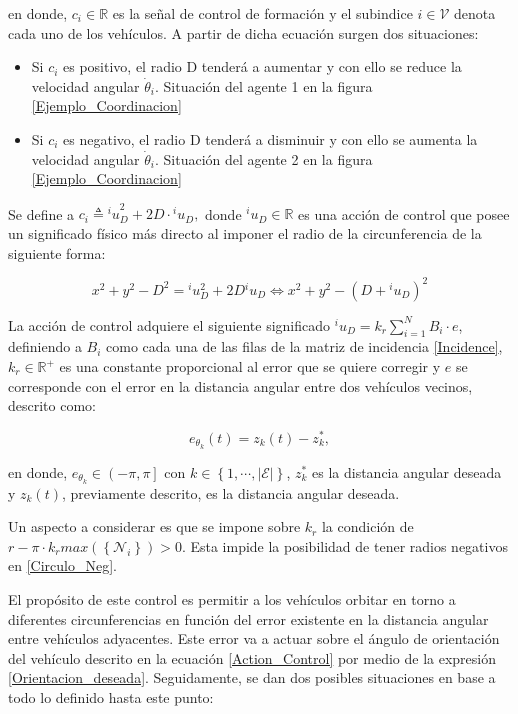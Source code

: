 en donde, $c_i \in \mathbb{R}$ es la señal de control de formación y el subindice $i\in\mathcal{V}$ denota cada uno de los vehículos. A partir de dicha ecuación surgen dos situaciones:

\begin{itemize}
	\item Si $c_i$ es positivo, el radio D tenderá a aumentar y con ello se reduce la velocidad angular $\dot{\theta}_i$. Situación del agente 1 en la figura \ref{Ejemplo_Coordinacion}
	\item Si $c_i$ es negativo, el radio D tenderá a disminuir y con ello se aumenta la velocidad angular $\dot{\theta}_i$. Situación del agente 2 en la figura \ref{Ejemplo_Coordinacion}
\end{itemize}
\newpage
Se define a $c_i\triangleq{^{i}u}_{D}^{2}+2D\cdot{^i}u_{D},$ donde $^{i}u_{D}\in\mathbb{R}$ es una acción de control que posee un significado físico más directo al imponer el radio de la circunferencia de la siguiente forma:

\begin{equation} \label{Circulo_Neg}
	x^2+y^2-D^2={^{i}}u_{D}^{2}+2D{^{i}}u_{D} \Leftrightarrow x^2+y^2-(D+{^{i}}u_{D})^2
\end{equation}

La acción de control adquiere el siguiente significado ${^{i}}{u}_{D}=k_{r}\sum_{i=1}^N{B_i}\cdot{e}$, definiendo a $B_i$ como cada una de las filas de la matriz de incidencia \ref{Incidence}, $k_r\in\mathbb{R}^{+}$ es una constante proporcional al error que se quiere corregir y $e$ se corresponde con el error en la distancia angular entre dos vehículos vecinos, descrito como: 

\begin{equation} \label{Error_Coordinacion}
	e_{\theta_{k}}\left(t\right)=z_{k}\left(t\right)-z_{k}^{*},
\end{equation}

en donde, $e_{\theta_{k}}\in\left(-\pi,\pi\right]$ con $k\in\left\lbrace{1,\cdots,|\mathcal{E}|}\right\rbrace$, $z_{k}^{*}$ es la distancia angular deseada y $z_{k}\left(t\right)$, previamente descrito, es la distancia angular deseada.

Un aspecto a considerar es que se impone sobre $k_{r}$ la condición de $r-\pi\cdot{k_{r}}max\left(\left\lbrace\mathcal{N}_{i}\right\rbrace\right)>0$. Esta impide la posibilidad de tener radios negativos en \ref{Circulo_Neg}.

El propósito de este control es permitir a los vehículos orbitar en torno a diferentes circunferencias en función del error existente en la distancia angular entre vehículos adyacentes. Este error va a actuar sobre el ángulo de orientación del vehículo descrito en la ecuación \ref{Action_Control} por medio de la expresión \ref{Orientacion_deseada}. Seguidamente, se dan dos posibles situaciones en base a todo lo definido hasta este punto:

